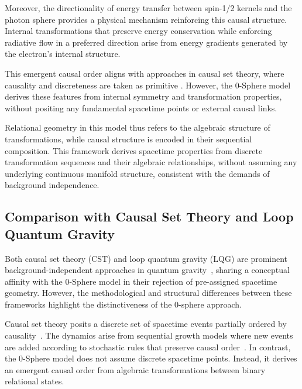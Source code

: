 \documentclass[%
 reprint,
 amsmath,amssymb,
 aps,
]{revtex4-1}
\numberwithin{equation}{section}%
\begin{document}
Moreover, the directionality of energy transfer between spin-1/2 kernels and the photon sphere \cite{hanamura2506.0072} provides a physical mechanism reinforcing this causal structure. Internal transformations that preserve energy conservation while enforcing radiative flow in a preferred direction arise from energy gradients generated by the electron's internal structure.

This emergent causal order aligns with approaches in causal set theory, where causality and discreteness are taken as primitive \cite{bombelli1987, surya2019}. However, the 0-Sphere model derives these features from internal symmetry and transformation properties, without positing any fundamental spacetime points or external causal links.

Relational geometry in this model thus refers to the algebraic structure of transformations, while causal structure is encoded in their sequential composition. This framework derives spacetime properties from discrete transformation sequences and their algebraic relationships, without assuming any underlying continuous manifold structure, consistent with the demands of background independence.


\subsection{Comparison with Causal Set Theory and Loop Quantum Gravity}
\label{subsec:cst_lqg_comparison}

Both causal set theory (CST) and loop quantum gravity (LQG) are prominent background-independent approaches in quantum gravity~\cite{oriti2009}, sharing a conceptual affinity with the 0-Sphere model in their rejection of pre-assigned spacetime geometry. However, the methodological and structural differences between these frameworks highlight the distinctiveness of the 0-sphere approach.

Causal set theory posits a discrete set of spacetime events partially ordered by causality~\cite{sorkin2003, dowker2005}. The dynamics arise from sequential growth models where new events are added according to stochastic rules that preserve causal order~\cite{rideout2000}. In contrast, the 0-Sphere model does not assume discrete spacetime points. Instead, it derives an emergent causal order from algebraic transformations between binary relational states.
\end{document}
